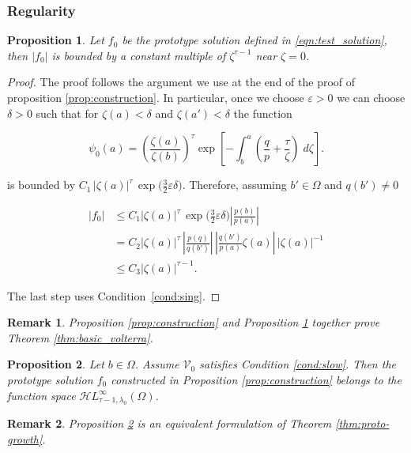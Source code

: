 \documentclass{article}
\theoremstyle{plain}
\newtheorem{prop}{Proposition}
\newtheorem{rmk}{Remark}
\newcommand{\singexp}[2]{\mathcal{H}L^\infty_{#1, #2}}
\newcommand{\hardpart}{\mathcal{V}_0}
\newcommand{\domain}{\Omega}
\begin{document}
\subsubsection{Regularity}\label{sec:asymptotics}

\begin{prop}\label{prop:asymptotic at zero}
    Let $f_0$ be the prototype solution defined in \eqref{eqn:test_solution}, then $|f_0|$ is bounded by a constant multiple of $\zeta^{\tau-1}$ near $\zeta=0$. 
\end{prop}

\begin{proof}
The proof follows the argument we use at the end of the proof of proposition \ref{prop:construction}. In particular, once we choose $\varepsilon>0$ we can choose $\delta>0$ such that for $\zeta(a)<\delta$ and $\zeta(a')<\delta$ the function

\[ \psi_0(a) = \left(\frac{\zeta(a)}{\zeta(b)}\right)^\tau \exp\left[-\int_b^a \left( \frac{q}{p} + \frac{\tau}{\zeta} \right)\;d\zeta\right]. \]

is bounded by $C_1 \, |\zeta(a)|^\tau \, \exp\big(\tfrac{3}{2}\varepsilon\delta\big)$. Therefore, assuming $b'\in\Omega$ and $q(b') \neq 0$

\begin{align*}
|f_0| &  \leq C_1 |\zeta(a)|^\tau \, \exp\big(\tfrac{3}{2}\varepsilon\delta\big) \left\vert  \frac{p(b)}{p(a)}\right\vert \\
& =  C_2 |\zeta(a)|^\tau \, \left\vert\frac{p(q)}{q(b')} \right\vert \, \left\vert \frac{q(b')}{p(a)} \zeta(a)\right\vert \, |\zeta(a)|^{-1} \\
&  \leq C_3 |\zeta(a)|^{\tau-1}.
\end{align*}

The last step uses Condition~\eqref{cond:sing}. 
\end{proof}
\color{Tomato}
\begin{rmk}
   {\em Proposition \ref{prop:construction}} and {\em Proposition \ref{prop:asymptotic at zero}} together prove {\em Theorem \ref{thm:basic_volterra}}. 
\end{rmk}
\color{black}

\begin{prop}\label{prop:asymptotic at infinity}
    Let $b\in\domain$. Assume $\hardpart$ satisfies {\em Condition} \eqref{cond:slow}. Then the prototype solution $f_0$ constructed in {\em Proposition \ref{prop:construction}} belongs to the function space $\singexp{\tau-1}{\lambda_0}(\domain)$.
\end{prop}
\color{Tomato}
\begin{rmk}
    {\em Proposition \ref{prop:asymptotic at infinity}} is an equivalent formulation of {\em Theorem \ref{thm:proto-growth}}.
\end{rmk}
\color{black}
\end{document}
